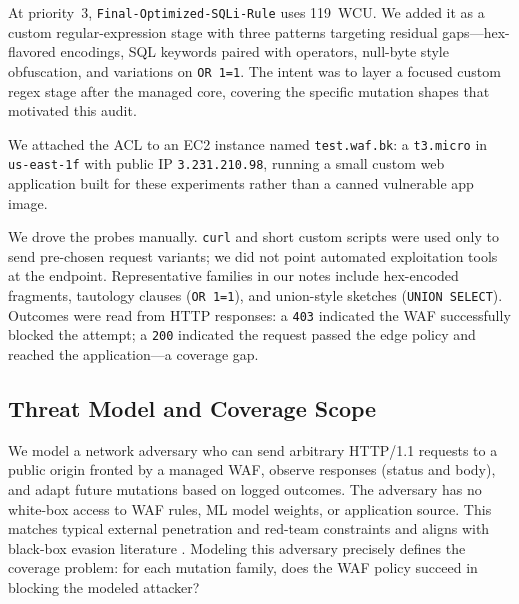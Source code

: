 At priority~3, \texttt{Final-Optimized-SQLi-Rule} uses 119~WCU. We added it as a custom regular-expression stage with three patterns targeting residual gaps---hex-flavored encodings, SQL keywords paired with operators, null-byte style obfuscation, and variations on \texttt{OR 1=1}. The intent was to layer a focused custom regex stage after the managed core, covering the specific mutation shapes that motivated this audit.

We attached the ACL to an EC2 instance named \texttt{test.waf.bk}: a \texttt{t3.micro} in \texttt{us-east-1f} with public IP \texttt{3.231.210.98}, running a small custom web application built for these experiments rather than a canned vulnerable app image.

We drove the probes manually. \texttt{curl} and short custom scripts were used only to send pre-chosen request variants; we did not point automated exploitation tools at the endpoint. Representative families in our notes include hex-encoded fragments, tautology clauses (\texttt{OR 1=1}), and union-style sketches (\texttt{UNION SELECT}). Outcomes were read from HTTP responses: a \texttt{403} indicated the WAF successfully blocked the attempt; a \texttt{200} indicated the request passed the edge policy and reached the application---a coverage gap.

\subsection{Threat Model and Coverage Scope}
We model a network adversary who can send arbitrary HTTP/1.1 requests to a public origin fronted by a managed WAF, observe responses (status and body), and adapt future mutations based on logged outcomes. The adversary has no white-box access to WAF rules, ML model weights, or application source. This matches typical external penetration and red-team constraints and aligns with black-box evasion literature \cite{guan2023ssqli,demetrio2020wafamole}. Modeling this adversary precisely defines the coverage problem: for each mutation family, does the WAF policy succeed in blocking the modeled attacker?

